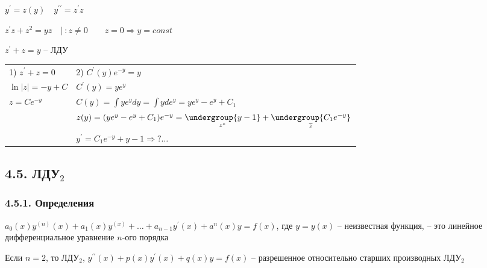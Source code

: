 \documentclass[12pt]{article}
\begin{document}
\begin{enumerate}[label*=\arabic** ]
        $y^\prime = z(y) \quad y^{\prime\prime} = z^\prime z$

        $z^\prime z + z^2 = yz \quad | \ : z \neq 0 \quad\quad z = 0 \Longrightarrow y = const$

        $z^\prime + z = y$ -- ЛДУ

        \begin{tabular}{p{5cm}p{10cm}}
            1) $z^\prime + z = 0$ & 2) $C^\prime (y) e^{-y} = y$                                                                                              \\

            $\ln|z| = -y + C$     & $C^\prime (y) = ye^{y}$                                                                                                   \\

            $z = Ce^{-y}$         & $C(y) = \int y e^y dy = \int y de^y = ye^y - e^y + C_1$                                                                   \\

            & $z(y) = (ye^y - e^y + C_1)e^{-y} = \underset{z^*}{\undergroup{y - 1}} + \underset{\overline{z}}{\undergroup{C_1 e^{-y}}}$ \\

            & $y^\prime = C_1 e^{-y} + y - 1 \Longrightarrow ? \dots $

        \end{tabular}

    \end{enumerate}


    \subsection{4.5. ЛДУ$_2$}

    \hypertarget{lineardifferentialequationhigherdegree}{}

    \subsubsection{4.5.1. Определения}

    \Def $a_0(x) y^{(n)}(x) + a_1(x)y^{(x)} + \dots + a_{n - 1}y^\prime(x) + a^n(x)y = f(x)$, где $y = y(x)$ -- неизвестная функция, -- это линейное дифференциальное уравнение $n$-ого порядка

    \Notas Если $n = 2$, то ЛДУ$_2$, $y^{\prime\prime}(x) + p(x)y^\prime(x) + q(x)y = f(x)$ -- разрешенное относительно старших производных ЛДУ$_2$
\end{document}
